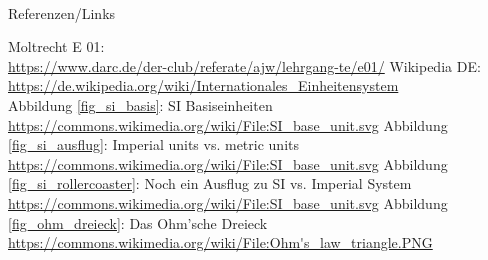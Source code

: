 \renewcommand{\refname}{Referenzen}

\hypertarget{refs}{}
\textcolor{white}{} \\ %
\Large Referenzen/Links
\footnotesize

\begin{thebibliography}{}
     Moltrecht E 01: \\
        \url{https://www.darc.de/der-club/referate/ajw/lehrgang-te/e01/}
        Wikipedia DE: \\
	    \url{https://de.wikipedia.org/wiki/Internationales_Einheitensystem}\\
	 Abbildung \ref{fig_si_basis}: SI Basiseinheiten\\
		\url{https://commons.wikimedia.org/wiki/File:SI_base_unit.svg}
	 Abbildung \ref{fig_si_ausflug}: Imperial units vs. metric units\\
		\url{https://commons.wikimedia.org/wiki/File:SI_base_unit.svg}
	 Abbildung \ref{fig_si_rollercoaster}: Noch ein Ausflug zu SI vs. Imperial System\\
		\url{https://commons.wikimedia.org/wiki/File:SI_base_unit.svg}
	 Abbildung \ref{fig_ohm_dreieck}: Das Ohm'sche Dreieck\\
		\url{https://commons.wikimedia.org/wiki/File:Ohm's_law_triangle.PNG}
	  
\end{thebibliography}


